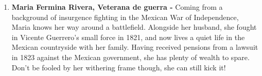 \documentclass[10pt, letterpaper]{article}
\begin{document}
\begin{enumerate}
\item
  
  \textbf{Maria Fermina Rivera, Veterana de guerra -} Coming from a
  background of insurgence fighting in the Mexican War of Independence,
  Maria knows her way around a battlefield. Alongside her husband, she
  fought in Vicente Guerrero's small force in 1821, and now lives a
  quiet life in the Mexican countryside with her family. Having received
  pensions from a lawsuit in 1823 against the Mexican government, she
  has plenty of wealth to spare. Don't be fooled by her withering frame
  though, she can still kick it!
  
\end{enumerate}
\end{document}
